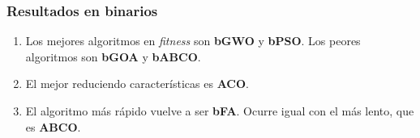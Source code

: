 \begin{frame}
    \frametitle{Resultados en binarios}
    \begin{enumerate}
        \item Los mejores algoritmos en \textit{fitness} son \textbf{bGWO} y \textbf{bPSO}. Los peores algoritmos son \textbf{bGOA} y \textbf{bABCO}.
        \item El mejor reduciendo características es \textbf{ACO}.
        \item El algoritmo más rápido vuelve a ser \textbf{bFA}. Ocurre igual con el más lento, que es \textbf{ABCO}.
    \end{enumerate}
\end{frame}